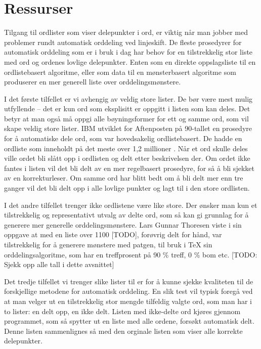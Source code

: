 \chapter{Ressurser}

Tilgang til ordlister som viser delepunkter i ord, er viktig når man jobber med problemer rundt automatisk orddeling ved linjeskift. De fleste prosedyrer for automatisk orddeling som er i bruk i dag har behov for en tilstrekkelig stor liste med ord og ordenes lovlige delepunkter. Enten som en direkte oppslagsliste til en ordlistebasert algoritme, eller som data til en mønsterbasert algoritme som produserer en mer generell liste over orddelingsmønstere. 

I det første tilfellet er vi avhengig av veldig store lister. De bør være mest mulig utfyllende -- det er kun ord som eksplisitt er oppgitt i listen som kan deles. Det betyr at man også må oppgi alle bøyningsformer for ett og samme ord, som vil skape veldig store lister. IBM utviklet for Aftenposten på 90-tallet en prosedyre for å automatiske dele ord, som var hovedsakelig ordlistebasert. De hadde en ordliste som inneholdt på det meste over 1,2 millioner \cite{epost-orddeling,thoresen1993virtuelle} . Når et ord skulle deles ville ordet bli slått opp i ordlisten og delt etter beskrivelsen der. Om ordet ikke fantes i listen vil det bli delt av en mer regelbasert prosedyre, for så å bli sjekket av en korrekturleser. Om samme ord har blitt bedt om å bli delt mer enn tre ganger vil det bli delt opp i alle lovlige punkter og lagt til i den store ordlisten. 

I det andre tilfellet trenger ikke ordlistene være like store. Der ønsker man kun et tilstrekkelig og representativt utvalg av delte ord, som så kan gi grunnlag for å generere mer generelle orddelingsmønstere. Lars Gunnar Thoresen viste i sin oppgave at med en liste over 1100 [TODO], forøvrig delt for hånd, var tilstrekkelig for å generere mønstere med patgen, til bruk i TeX sin orddelingsalgoritme, som har en treffprosent på 90 \% treff, 0 \% bom etc. [TODO: Sjekk opp alle tall i dette avsnittet]

Det tredje tilfellet vi trenger slike lister til er for å kunne sjekke kvaliteten til de forskjellige metodene for automatisk orddeling. En slik test vil typisk foregå ved at man velger ut en tilstrekkelig stor mengde tilfeldig valgte ord, som man har i to lister: en delt opp, en ikke delt. Listen med ikke-delte ord kjøres gjennom programmet, som så spytter ut en liste med alle ordene, forsøkt automatisk delt. Denne listen sammenlignes så med den orginale listen som viser alle korrekte delepunkter. 

